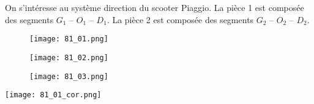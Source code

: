 \normaltrue \difficilefalse \tdifficilefalse
\correctionfalse

\setcounter{question}{0}%


\ifcorrection
\else
{}
\fi


\ifprof
\else
On s'intéresse au système direction du scooter Piaggio. 
La pièce 1 est composée des segments $G_1$ -- $O_1$ -- $D_1$.
La pièce 2 est composée des segments $G_2$ -- $O_2$ -- $D_2$.

\begin{figure*}[!h]
\centering
\begin{subfigure}[c]{.3\linewidth}
\centering
\texttt{[image: 81\_01.png]}
\end{subfigure} \hfill
\begin{subfigure}[c]{.3\linewidth}
\centering
\texttt{[image: 81\_02.png]}
\end{subfigure} \hfill
\begin{subfigure}[c]{.3\linewidth}
\centering
\texttt{[image: 81\_03.png]}
\end{subfigure} 
\end{figure*}
\fi

\ifprof
\begin{center}
\texttt{[image: 81\_01\_cor.png]}
\end{center}
\else
\fi

